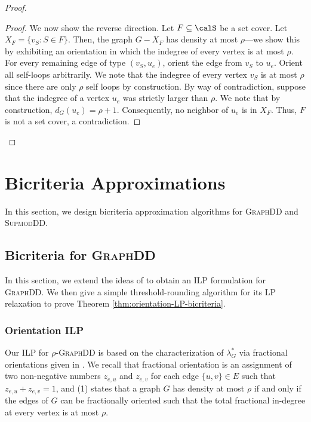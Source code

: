 \documentclass{article}
\newcommand{\densitydeletionset}{\textsc{GraphDD}\xspace}
\newcommand{\rhodensitydeletionset}{\ensuremath{\rho\text{-}}\densitydeletionset\xspace}
\newcommand{\supmoddensitydeletionset}{\textsc{SupmodDD}\xspace}
\begin{document}
\begin{proof}
\begin{proof}
    We now show the reverse direction. Let $F \subseteq \calS$ be a set cover. Let $X_F = \{v_S : S \in F\}$. Then, the graph $G - X_F$ has density at most $\rho$---we show this by exhibiting an orientation in which the indegree of every vertex is at most $\rho$. For every remaining edge of type $(v_S, u_e)$, orient the edge from $v_S$ to $u_e$. Orient all self-loops arbitrarily. We note that the indegree of every vertex $v_S$ is at most $\rho$ since there are only $\rho$ self loops by construction. By way of contradiction, suppose that the indegree of a vertex $u_e$ was strictly larger than $\rho$. We note that by construction, $d_G(u_e) = \rho+1$. Consequently, no neighbor of $u_e$ is in $X_F$. Thus, $F$ is not a set cover, a contradiction.
\end{proof}
\end{proof}
\fi

%
 \section{Bicriteria Approximations}\label{sec:bicriteria-algorithm}
In this section, we design bicriteria approximation algorithms for \densitydeletionset and \supmoddensitydeletionset.

\subsection{Bicriteria for \densitydeletionset}\label{sec:orientation-bicriteria}

In this section, we extend the ideas of \cite{chandrasekaran2024polyhedralaspectsfeedbackvertex} to obtain an ILP formulation for \densitydeletionset. We then give a simple threshold-rounding algorithm for its LP relaxation to prove Theorem \ref{thm:orientation-LP-bicriteria}. 

\subsubsection{Orientation ILP}


Our ILP for \rhodensitydeletionset is based on the characterization of $\lambda^*_G$ via fractional orientations given in . We recall that fractional orientation is an assignment of
two non-negative numbers $z_{e,u}$ and $z_{e,v}$ for each edge $\{u,v\} \in E$ such that 
$z_{e, u}+ z_{e,v}=1$, and
(1) states that a graph $G$ has density at most $\rho$
if and only if the edges of $G$ can be fractionally oriented such that the total fractional in-degree at every vertex is at most $\rho$.
\end{document}
